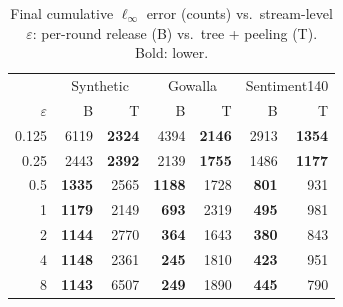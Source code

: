 \begin{table}[t]\centering\footnotesize
\caption{Final cumulative $\ell_\infty$ error (counts) vs.\ stream-level $\varepsilon$: per-round release (B) vs.\ tree + peeling (T). Bold: lower.}\label{tab:eps}
\setlength{\tabcolsep}{3pt}\begin{tabular}{rrrrrrr}\toprule
 & \multicolumn{2}{c}{Synthetic} & \multicolumn{2}{c}{Gowalla} & \multicolumn{2}{c}{Sentiment140}\\
$\varepsilon$ & B & T & B & T & B & T\\\midrule
0.125 & 6119 & \textbf{2324} & 4394 & \textbf{2146} & 2913 & \textbf{1354}\\
0.25 & 2443 & \textbf{2392} & 2139 & \textbf{1755} & 1486 & \textbf{1177}\\
0.5 & \textbf{1335} & 2565 & \textbf{1188} & 1728 & \textbf{801} & 931\\
1 & \textbf{1179} & 2149 & \textbf{693} & 2319 & \textbf{495} & 981\\
2 & \textbf{1144} & 2770 & \textbf{364} & 1643 & \textbf{380} & 843\\
4 & \textbf{1148} & 2361 & \textbf{245} & 1810 & \textbf{423} & 951\\
8 & \textbf{1143} & 6507 & \textbf{249} & 1890 & \textbf{445} & 790\\
\bottomrule\end{tabular}\end{table}
